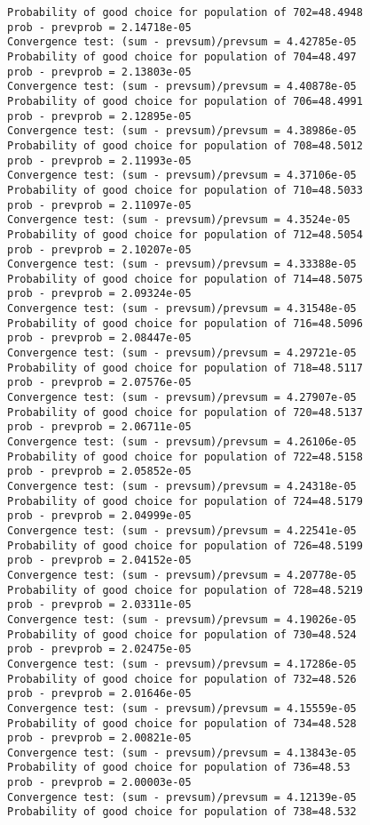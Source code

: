 \documentclass[11pt,onecolumn]{article}
\begin{document}
\begin{verbatim}
Probability of good choice for population of 702=48.4948
prob - prevprob = 2.14718e-05
Convergence test: (sum - prevsum)/prevsum = 4.42785e-05
Probability of good choice for population of 704=48.497
prob - prevprob = 2.13803e-05
Convergence test: (sum - prevsum)/prevsum = 4.40878e-05
Probability of good choice for population of 706=48.4991
prob - prevprob = 2.12895e-05
Convergence test: (sum - prevsum)/prevsum = 4.38986e-05
Probability of good choice for population of 708=48.5012
prob - prevprob = 2.11993e-05
Convergence test: (sum - prevsum)/prevsum = 4.37106e-05
Probability of good choice for population of 710=48.5033
prob - prevprob = 2.11097e-05
Convergence test: (sum - prevsum)/prevsum = 4.3524e-05
Probability of good choice for population of 712=48.5054
prob - prevprob = 2.10207e-05
Convergence test: (sum - prevsum)/prevsum = 4.33388e-05
Probability of good choice for population of 714=48.5075
prob - prevprob = 2.09324e-05
Convergence test: (sum - prevsum)/prevsum = 4.31548e-05
Probability of good choice for population of 716=48.5096
prob - prevprob = 2.08447e-05
Convergence test: (sum - prevsum)/prevsum = 4.29721e-05
Probability of good choice for population of 718=48.5117
prob - prevprob = 2.07576e-05
Convergence test: (sum - prevsum)/prevsum = 4.27907e-05
Probability of good choice for population of 720=48.5137
prob - prevprob = 2.06711e-05
Convergence test: (sum - prevsum)/prevsum = 4.26106e-05
Probability of good choice for population of 722=48.5158
prob - prevprob = 2.05852e-05
Convergence test: (sum - prevsum)/prevsum = 4.24318e-05
Probability of good choice for population of 724=48.5179
prob - prevprob = 2.04999e-05
Convergence test: (sum - prevsum)/prevsum = 4.22541e-05
Probability of good choice for population of 726=48.5199
prob - prevprob = 2.04152e-05
Convergence test: (sum - prevsum)/prevsum = 4.20778e-05
Probability of good choice for population of 728=48.5219
prob - prevprob = 2.03311e-05
Convergence test: (sum - prevsum)/prevsum = 4.19026e-05
Probability of good choice for population of 730=48.524
prob - prevprob = 2.02475e-05
Convergence test: (sum - prevsum)/prevsum = 4.17286e-05
Probability of good choice for population of 732=48.526
prob - prevprob = 2.01646e-05
Convergence test: (sum - prevsum)/prevsum = 4.15559e-05
Probability of good choice for population of 734=48.528
prob - prevprob = 2.00821e-05
Convergence test: (sum - prevsum)/prevsum = 4.13843e-05
Probability of good choice for population of 736=48.53
prob - prevprob = 2.00003e-05
Convergence test: (sum - prevsum)/prevsum = 4.12139e-05
Probability of good choice for population of 738=48.532

\end{verbatim}
\end{document}
